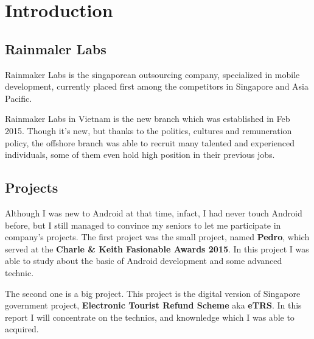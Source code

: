 \chapter{Introduction}
\section{Rainmaler Labs}

Rainmaker Labs is the singaporean outsourcing company, specialized in mobile development, currently placed first among the competitors in Singapore and Asia Pacific. 

Rainmaker Labs in Vietnam is the new branch which was established in Feb 2015. Though it's new, but thanks to the politics, cultures and remuneration policy, the offshore branch was able to recruit many talented and experienced individuals, some of them even hold high position in their previous jobs.

\section{Projects}

Although I was new to Android at that time, infact, I had never touch Android before, but I still managed to convince my seniors to let me participate in company's projects. The first project was the small project, named \textbf{Pedro}, which served at the \textbf{Charle \& Keith Fasionable Awards 2015}. In this project I was able to study about the basic of Android development and some advanced technic.

The second one is a big project. This project is the digital version of Singapore government project, \textbf{Electronic Tourist Refund Scheme} aka \textbf{eTRS}. In this report I will concentrate on the technics, and knownledge which I was able to acquired. 
